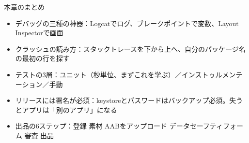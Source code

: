 \begin{tcbsummary}{本章のまとめ}
\begin{itemize}
  \item デバッグの三種の神器：Logcatでログ、ブレークポイントで変数、Layout Inspectorで画面
  \item クラッシュの読み方：スタックトレースを下から上へ、自分のパッケージ名の最初の行を探す
  \item テストの3層：ユニット（秒単位、まずこれを学ぶ）／インストゥルメンテーション／手動
  \item リリースには署名が必須：keystoreとパスワードはバックアップ必須。失うとアプリは「別のアプリ」になる
  \item 出品の6ステップ：登録 素材 AABをアップロード データセーフティフォーム 審査 出品
\end{itemize}

\end{tcbsummary}
